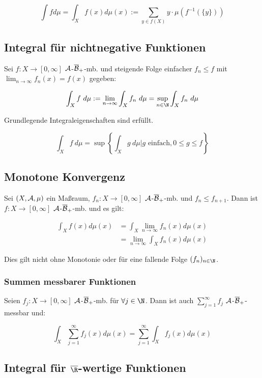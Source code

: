 $$\int f d\mu = \int_X f(x) d\mu(x) := \sum_{y \in f(X)} y \cdot \mu(f^{-1}(\{y\}))$$

\subsection*{Integral für nichtnegative Funktionen}

Sei $f : X \to [0, \infty]$ $\mathcal{A}$-$\overline{\mathcal{B}}_+$-mb. und steigende Folge einfacher $f_n \leq f$ mit $\displaystyle\lim_{n \to \infty} f_n(x) = f(x)$ gegeben:

\vspace{-2mm}
$$\int_X f \ d\mu := \lim_{n \to \infty} \int_X f_n \ d\mu = \sup_{n \in \N} \int_X f_n \ d\mu$$

Grundlegende Integraleigenschaften sind erfüllt.

\vspace{-4mm}
$$\int_X f \ d\mu = \sup\left\{ \int_X g \ d\mu | g \text{ einfach}, 0 \leq g \leq f \right\}$$

\subsection*{Monotone Konvergenz}

Sei $(X, \mathcal{A}, \mu)$ ein Maßraum, $f_n : X \to [0,\infty]$ $\mathcal{A}$-$\overline{\mathcal{B}}_+$-mb. und $f_n \leq f_{n+1}$. Dann ist $f : X \to [0,\infty]$ $\mathcal{A}$-$\overline{\mathcal{B}}_+$-mb. und es gilt:

\vspace{-4mm}
\begin{align*}
	\int_X f(x) d\mu(x) &= \int_X \lim_{n \to \infty} f_n(x) d\mu(x)\\
	               &= \lim_{n \to \infty} \int_X f_n(x) d\mu(x)
\end{align*}

Dies gilt nicht ohne Monotonie oder für eine fallende Folge $(f_n)_{n \in \N}$.

\subsubsection*{Summen messbarer Funktionen}

Seien $f_j : X \to [0,\infty]$ $\mathcal{A}$-$\overline{\mathcal{B}}_+$-mb. für $\forall j \in \N$. Dann ist auch $\sum_{j=1}^\infty f_j$ $\mathcal{A}$-$\overline{\mathcal{B}}_+$-messbar und:

$$\int_X \sum_{j=1}^\infty f_j(x) d\mu(x) = \sum_{j=1}^\infty \int_X f_j(x) d\mu(x)$$

\subsection*{Integral für $\overline\R$-wertige Funktionen}

